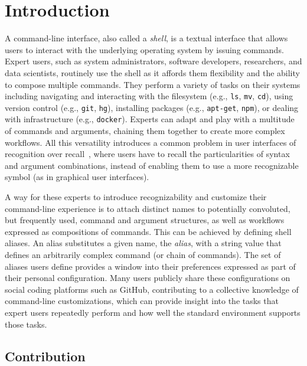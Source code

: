 \documentclass[smallextended,natbib]{svjour3}
\newcommand{\cmd}[1]{{\texttt{#1}}}
\begin{document}
\section{Introduction}

A command-line interface, also called a \emph{shell}, is a textual interface that allows users to interact with the underlying operating system by issuing commands.
Expert users, such as system administrators, software developers, researchers, and data scientists, routinely use the shell as it affords them flexibility and the ability to compose multiple commands.
They perform a variety of tasks on their systems including navigating and interacting with the filesystem (e.g., \cmd{ls}, \cmd{mv}, \cmd{cd}), using version control (e.g., \cmd{git}, \cmd{hg}), installing packages (e.g., \cmd{apt-get}, \cmd{npm}), or dealing with infrastructure (e.g., \cmd{docker}).
Experts can adapt and play with a multitude of commands and arguments, chaining them together to create more complex workflows.
All this versatility introduces a common problem in user interfaces of recognition over recall~\citep{nielsen:05}, where users have to recall the particularities of syntax and argument combinations, instead of enabling them to use a more recognizable symbol (as in graphical user interfaces).

A way for these experts to introduce recognizability and customize their command-line experience is to attach distinct names to potentially convoluted, but frequently used, command and argument structures, as well as workflows expressed as compositions of commands.
This can be achieved by defining shell aliases.
An alias substitutes a given name, the \emph{alias}, with a string value that defines an arbitrarily complex command (or chain of commands).
The set of aliases users define provides a window into their preferences expressed as part of their personal configuration.
Many users publicly share these configurations on social coding platforms such as GitHub, contributing to a collective knowledge of command-line customizations, which can provide insight into the tasks that expert users repeatedly perform and how well the standard environment supports those tasks. 

\subsection{Contribution}
\end{document}
